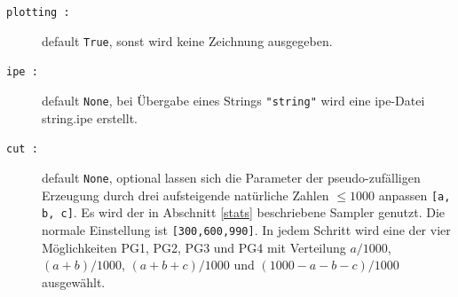 \begin{description}
\begin{description}
\item[\texttt{plotting :}] default \texttt{True}, sonst wird keine Zeichnung ausgegeben.
\item[\texttt{ipe :}] default \texttt{None}, bei Übergabe eines Strings \texttt{\char"string"} wird eine ipe-Datei string.ipe erstellt.
\item[\texttt{cut :}] default \texttt{None}, optional lassen sich die Parameter der pseudo-zufälligen Erzeugung durch drei aufsteigende natürliche Zahlen $\leq 1000$ anpassen \texttt{[a, b, c]}. Es wird der in Abschnitt \ref{stats} beschriebene Sampler genutzt. Die normale Einstellung ist \texttt{[300,600,990]}. In jedem Schritt wird eine der vier Möglichkeiten PG1, PG2, PG3 und PG4 mit Verteilung $a/1000$, $(a+b)/1000$, $(a+b+c)/1000$ und $(1000-a-b-c)/1000$ ausgewählt.
\end{description}
\end{description}

